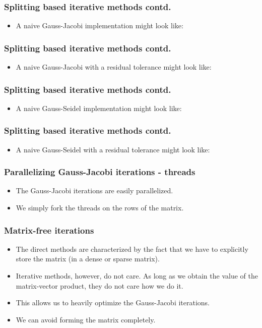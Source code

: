 \documentclass{beamer}
\begin{document}
\begin{frame}\frametitle{Splitting based iterative methods contd.}
  \begin{itemize}
    \item A naive Gauss-Jacobi implementation might look like:
      
  \end{itemize}
\end{frame}
\begin{frame}\frametitle{Splitting based iterative methods contd.}
  \begin{itemize}
    \item A naive Gauss-Jacobi with a residual tolerance might look like:
      
  \end{itemize}
\end{frame}
\begin{frame}\frametitle{Splitting based iterative methods contd.}
  \begin{itemize}
    \item A naive Gauss-Seidel implementation might look like:
      
  \end{itemize}
\end{frame}
\begin{frame}\frametitle{Splitting based iterative methods contd.}
  \begin{itemize}
    \item A naive Gauss-Seidel with a residual tolerance might look like:
      
  \end{itemize}
\end{frame}
\begin{frame}\frametitle{Parallelizing Gauss-Jacobi iterations - threads}
  \begin{itemize}
    \item The Gauss-Jacobi iterations are easily parallelized.
    \item We simply fork the threads on the rows of the matrix.
      
  \end{itemize}
\end{frame}
\begin{frame}\frametitle{Matrix-free iterations}
  \begin{itemize}
    \item The direct methods are characterized by the fact that we have to explicitly store
          the matrix (in a dense or sparse matrix).
    \item Iterative methods, however, do not care. As long as we obtain the value of the matrix-vector
          product, they do not care how we do it.
    \item This allows us to heavily optimize the Gauss-Jacobi iterations.
    \item We can avoid forming the matrix completely.
  \end{itemize}
\end{frame}
\end{document}

